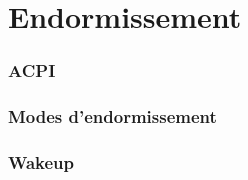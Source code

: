 \section{Endormissement}

\begin{frame}
	\frametitle{ACPI}
\end{frame}

\begin{frame}
	\frametitle{Modes d'endormissement}
\end{frame}

\begin{frame}
	\frametitle{Wakeup}
\end{frame}



